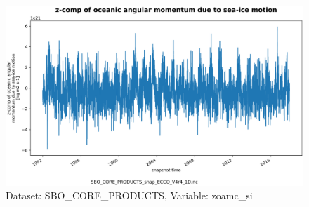 \begin{figure}[H]
\centering
\includegraphics[scale=0.55]{../images/plots/oneD_plots/SBO_Core_Products/zoamc_si.png}
\caption{Dataset: SBO\_CORE\_PRODUCTS, Variable: zoamc\_si}
\label{tab:table-SBO_CORE_PRODUCTS_zoamc_si-Plot}
\end{figure}
\pagebreak

